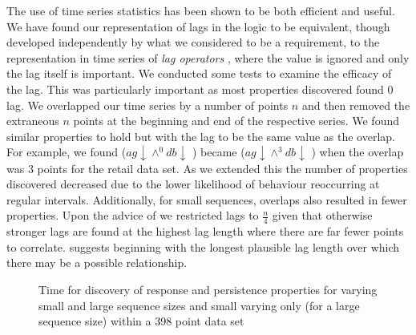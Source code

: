 The use of time series statistics has been shown to be both efficient and
useful. We have found our representation of lags in the logic to be
equivalent, though developed independently by what we considered to be a requirement, to the representation in time series of {\em lag
operators} \cite{end95}, where the value is ignored and only the lag
itself is important. We conducted some tests to examine the efficacy
of the lag. This was particularly important as most properties
discovered found 0 lag. We overlapped our time series by a number of
points $n$ and then removed the extraneous $n$ points at the beginning
and end of the respective series. We found similar properties to hold
but with the lag to be the same value as the overlap. For example, we
found  ($ag \downarrow \wedge^{0} db \downarrow$ ) became
 ($ag \downarrow \wedge^{3} db \downarrow$ ) when the overlap
was 3 points for the retail data set. As we extended
this the number of properties discovered decreased due to the lower
likelihood of behaviour reoccurring at regular intervals. Additionally,
for small sequences, overlaps also resulted in fewer properties. Upon
the advice of \cite{ko90} we restricted lags to $\frac{n}{4}$ given
that otherwise stronger lags are found at the highest lag length where
there are far fewer points to correlate.  \cite{end95} suggests
beginning with the longest plausible lag length over which there may
be a possible relationship. 


\begin{figure}
\centerline{}
\caption{\label{graph:prop_disc_time}{Time for discovery of
response and persistence properties for varying small and large
sequence sizes and small varying only (for a large sequence size)
within a 398 point data set}}
\end{figure}

